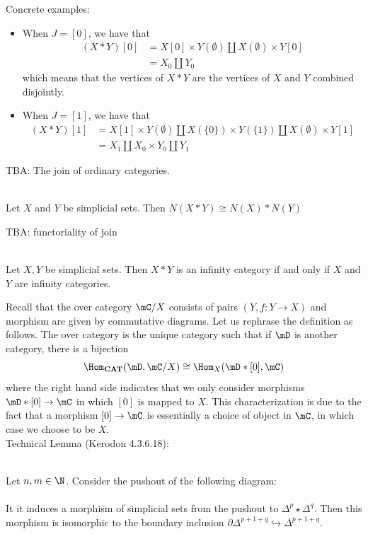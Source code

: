 \documentclass[a4paper]{article}
\begin{document}
Concrete examples: 
\begin{itemize}
\item When $J=[0]$, we have that 
\begin{align*}
(X\ast Y)[0]&=X[0]\times Y(\emptyset)\amalg X(\emptyset)\times Y[0]\\
&=X_0\amalg Y_0
\end{align*}
which means that the vertices of $X\ast Y$ are the vertices of $X$ and $Y$ combined disjointly. 
\item When $J=[1]$, we have that 
\begin{align*}
(X\ast Y)[1]&=X[1]\times Y(\emptyset)\amalg X(\{0\})\times Y(\{1\}) \amalg X(\emptyset)\times Y[1]\\
&=X_1\amalg X_0\times Y_0\amalg Y_1
\end{align*}
\end{itemize}

TBA: The join of ordinary categories. 

\begin{lmm}{}{}\\ Let $X$ and $Y$ be simplicial sets. Then $N(X\ast Y)\cong N(X)\ast N(Y)$
\end{lmm}

TBA: functoriality of join

\begin{prp}{}{}\\ Let $X,Y$ be simplicial sets. Then $X\ast Y$ is an infinity category if and only if $X$ and $Y$ are infinity categories. 
\end{prp}

Recall that the over category $\mC/X$ consists of pairs $(Y,f:Y\to X)$ and morphism are given by commutative diagrams. Let us rephrase the definition as follows. The over category is the unique category such that if $\mD$ is another category, there is a bijection $$\Hom_\bold{CAT}(\mD,\mC/X)\cong\Hom_X(\mD\ast[0],\mC)$$ where the right hand side indicates that we only consider morphisms $\mD\ast[0]\to\mC$ in which $[0]$ is mapped to $X$. This characterization is due to the fact that a morphism $[0]\to\mC$ is essentially a choice of object in $\mC$, in which case we choose to be $X$. \\

Technical Lemma (Kerodon 4.3.6.18): 

\begin{prp}{}{}\\ Let $n,m\in\N$. Consider the pushout of the following diagram: \\
\\
It it induces a morphism of simplicial sets from the pushout to $\Delta^p\star\Delta^q$. Then this morphism is isomorphic to the boundary inclusion $\partial\Delta^{p+1+q}\hookrightarrow\Delta^{p+1+q}$. 
\end{prp}
\end{document}
